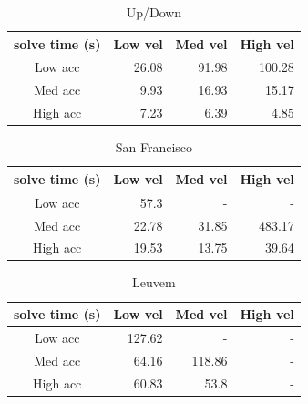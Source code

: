 \clearpage

\begin{table}[]
\centering
\begin{tabular}{ c || r | r | r}
solve time (s) & Low vel& Med vel& High vel\\
\hline\hline
Low acc 	& 26.08		& 91.98		& 100.28	\\ \hline
Med acc		& 9.93		& 16.93		& 15.17		\\  \hline
High acc	& 7.23		& 6.39		& 4.85 		\\  
\end{tabular}
\caption{Up/Down}
\label{table:synth-agility-data}
\end{table}

\begin{table}[]
\centering
\begin{tabular}{ c || r | r | r}
solve time (s) & Low vel& Med vel& High vel\\
\hline\hline
Low acc 	& 57.3		& -			& -			\\ \hline
Med acc		& 22.78		& 31.85		& 483.17	\\  \hline
High acc	& 19.53		& 13.75		& 39.64 		\\  
\end{tabular}
\caption{San Francisco}
\label{table:sf-agility-data}
\end{table}


\begin{table}[]
\centering
\begin{tabular}{ c || r | r | r}
solve time (s) & Low vel& Med vel& High vel\\
\hline\hline
Low acc 	& 127.62	& -			& -			\\ \hline
Med acc		& 64.16		& 118.86	& -			\\  \hline
High acc	& 60.83		& 53.8		& - 		\\  
\end{tabular}
\caption{Leuvem}
\label{table:leuven-agility-data}
\end{table}

